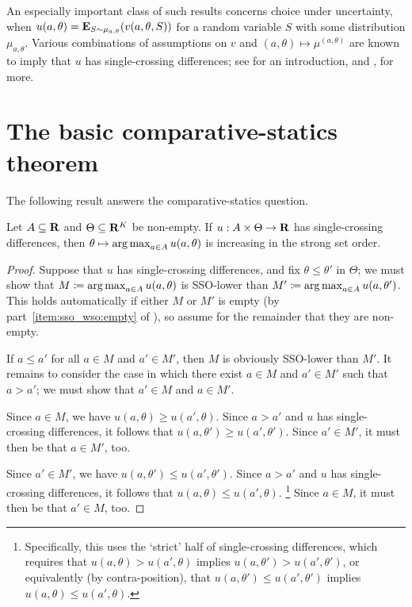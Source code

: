 An especially important class of such results concerns choice under uncertainty, when $u(a,\theta) = \mathbf{E}_{S \sim \mu_{a,\theta}}( v(a,\theta,S) )$ for a random variable $S$ with some distribution $\mu_{a,\theta}$. Various combinations of assumptions on $v$ and $(a,\theta) \mapsto \mu^{(a,\theta)}$ are known to imply that $u$ has single-crossing differences; see \textcite[][section~5]{Sarver2023} for an introduction, and \textcite[Lemma~1]{KarlinRubin1956}, \textcite{Athey2002,QuahStrulovici2012} for more.



\section{The basic comparative-statics theorem}
\label{mcs:mcs}

The following result answers the comparative-statics question.

\begin{theorem}
	\label{theorem:topkis_ms}
	Let $A \subseteq \mathbf{R}$ and $\Theta \subseteq \mathbf{R}^K$ be non-empty. If $u : A \times \Theta \to \mathbf{R}$ has single-crossing differences, then $\theta \mapsto \operatorname*{arg\,max}_{a \in A} u(a,\theta)$ is increasing in the strong set order.
\end{theorem}

\begin{proof}
	Suppose that $u$ has single-crossing differences, and fix $\theta \leq \theta'$ in $\Theta$; we must show that $M \coloneqq \operatorname*{arg\,max}_{a \in A} u(a,\theta)$ is SSO-lower than $M' \coloneqq \operatorname*{arg\,max}_{a \in A} u(a,\theta')$. This holds automatically if either $M$ or $M'$ is empty (by part~\ref{item:sso_wso:empty} of ), so assume for the remainder that they are non-empty.

	If $a \leq a'$ for all $a \in M$ and $a' \in M'$, then $M$ is obviously SSO-lower than $M'$. It remains to consider the case in which there exist $a \in M$ and $a' \in M'$ such that $a > a'$; we must show that $a' \in M$ and $a \in M'$.

	Since $a \in M$, we have $u(a,\theta) \geq u(a',\theta)$. Since $a > a'$ and $u$ has single-crossing differences, it follows that $u(a,\theta') \geq u(a',\theta')$. Since $a' \in M'$, it must then be that $a \in M'$, too.

	Since $a' \in M'$, we have $u(a,\theta') \leq u(a',\theta')$. Since $a > a'$ and $u$ has single-crossing differences, it follows that $u(a,\theta) \leq u(a',\theta)$.%
		\footnote{Specifically, this uses the `strict' half of single-crossing differences, which requires that $u(a,\theta) > u(a',\theta)$ implies $u(a,\theta') > u(a',\theta')$, or equivalently (by contra-position), that $u(a,\theta') \leq u(a',\theta')$ implies $u(a,\theta) \leq u(a',\theta)$.}
	Since $a \in M$, it must then be that $a' \in M$, too.
\end{proof}

